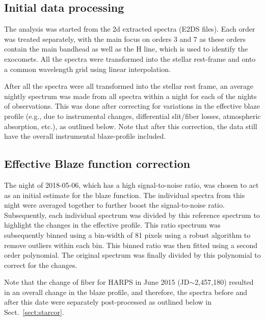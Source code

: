 \documentclass{aa}
\begin{document}
\subsection{Initial data processing}
The analysis was started from the 2d extracted spectra (E2DS files).
%
Each order was treated separately, with the main focus on orders 3 and 7 as these orders contain the main  bandhead as well as the  H line, which is used to identify the exocomets.
%
All the spectra were transformed into the stellar rest-frame and onto a common wavelength grid using linear interpolation. %

%
After all the spectra were all transformed into the stellar rest frame, an average nightly spectrum was made from all spectra within a night for each of the nights of observations. This was done after correcting for variations in the effective blaze profile (e.g., due to instrumental changes, differential slit/fiber losses, atmospheric absorption, etc.), as outlined below. Note that after this correction, the %
data still have the overall instrumental blaze-profile included.%

\subsection{Effective Blaze function correction}\label{sect:blaze}

The night of 2018-05-06, which has a high signal-to-noise ratio, was chosen to act as an initial estimate for the blaze function.%
%
The individual spectra from this night were averaged together to further boost the signal-to-noise ratio.
%
Subsequently, each individual spectrum was divided by this reference spectrum to highlight the changes in the effective profile.
%
This ratio spectrum was subsequently binned using a bin-width of 81 pixels using a robust algorithm to remove outliers within each bin. This binned ratio was then fitted using a second order polynomial.
%
The original spectrum was finally divided by this polynomial to correct for the changes.

Note that the change of fiber for HARPS in June 2015 (JD$\sim$2,457,180) resulted in an overall change in the blaze profile, and therefore, the spectra before and after this date were separately post-processed as outlined below in Sect.~\ref{sect:starcor}.
\end{document}
